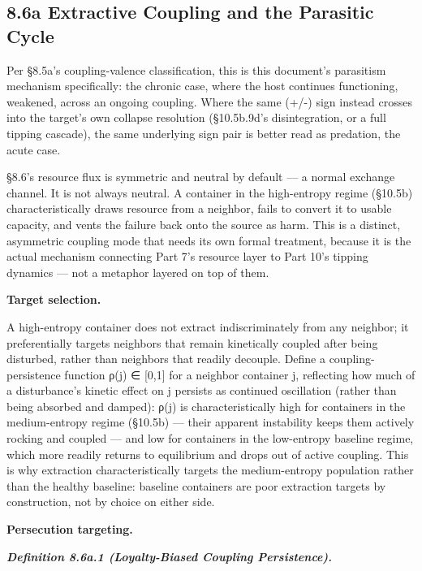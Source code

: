 \documentclass[
]{article}
\begin{document}
\hypertarget{a-extractive-coupling-and-the-parasitic-cycle}{%
\subsection{8.6a Extractive Coupling and the Parasitic
Cycle}\label{a-extractive-coupling-and-the-parasitic-cycle}}

Per §8.5a's coupling-valence classification, this is this document's
parasitism mechanism specifically: the chronic case, where the host
continues functioning, weakened, across an ongoing coupling. Where the
same (+/-) sign instead crosses into the target's own collapse
resolution (§10.5b.9d's disintegration, or a full tipping cascade), the
same underlying sign pair is better read as predation, the acute case.

§8.6's resource flux is symmetric and neutral by default --- a normal
exchange channel. It is not always neutral. A container in the
high-entropy regime (§10.5b) characteristically draws resource from a
neighbor, fails to convert it to usable capacity, and vents the failure
back onto the source as harm. This is a distinct, asymmetric coupling
mode that needs its own formal treatment, because it is the actual
mechanism connecting Part 7's resource layer to Part 10's tipping
dynamics --- not a metaphor layered on top of them.

\textbf{Target selection.}

A high-entropy container does not extract indiscriminately from any
neighbor; it preferentially targets neighbors that remain kinetically
coupled after being disturbed, rather than neighbors that readily
decouple. Define a coupling-persistence function ρ(j) ∈ {[}0,1{]} for a
neighbor container j, reflecting how much of a disturbance's kinetic
effect on j persists as continued oscillation (rather than being
absorbed and damped): ρ(j) is characteristically high for containers in
the medium-entropy regime (§10.5b) --- their apparent instability keeps
them actively rocking and coupled --- and low for containers in the
low-entropy baseline regime, which more readily returns to equilibrium
and drops out of active coupling. This is why extraction
characteristically targets the medium-entropy population rather than the
healthy baseline: baseline containers are poor extraction targets by
construction, not by choice on either side.

\textbf{Persecution targeting.}

\emph{\textbf{Definition 8.6a.1 (Loyalty-Biased Coupling Persistence).}}
\end{document}
